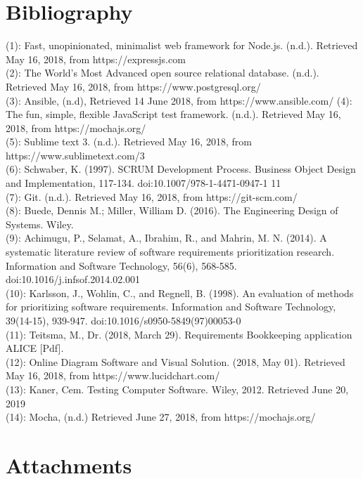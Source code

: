 \documentclass[paper=a4, fontsize=11pt,twoside]{scrartcl}	%
\begin{document}
\section{Bibliography}
(1): Fast, unopinionated, minimalist web framework for Node.js. (n.d.). Retrieved May 16, 2018, from https://expressjs.com \\ 
(2): The World's Most Advanced open source relational database. (n.d.). Retrieved May 16, 2018, from https://www.postgresql.org/ \\
(3): Ansible, (n.d), Retrieved 14 June 2018, from https://www.ansible.com/
(4): The fun, simple, flexible JavaScript test framework. (n.d.). Retrieved May 16, 2018, from https://mochajs.org/ \\
(5): Sublime text 3. (n.d.). Retrieved May 16, 2018, from https://www.sublimetext.com/3 \\
(6): Schwaber, K. (1997). SCRUM Development Process. Business Object Design and Implementation, 117-134. doi:10.1007/978-1-4471-0947-1 11\\ 
(7): Git. (n.d.). Retrieved May 16, 2018, from https://git-scm.com/ \\
(8): Buede, Dennis M.; Miller, William D. (2016). The Engineering Design of Systems. Wiley. \\
(9): Achimugu, P., Selamat, A., Ibrahim, R., and Mahrin, M. N. (2014). A systematic literature review of software requirements prioritization research. Information and Software Technology, 56(6), 568-585. doi:10.1016/j.infsof.2014.02.001 \\
(10): Karlsson, J., Wohlin, C., and Regnell, B. (1998). An evaluation of methods for prioritizing software requirements. Information and Software Technology, 39(14-15), 939-947. doi:10.1016/s0950-5849(97)00053-0 \\
(11): Teitsma, M., Dr. (2018, March 29). Requirements Bookkeeping application ALICE [Pdf]. \\
(12): Online Diagram Software and Visual Solution. (2018, May 01). Retrieved May 16, 2018, from https://www.lucidchart.com/ \\
(13): Kaner, Cem. Testing Computer Software. Wiley, 2012.
 Retrieved June 20, 2019 \\
(14): Mocha, (n.d.) Retrieved June 27, 2018, from https://mochajs.org/ 







 
\newpage

\section{Attachments}
\renewcommand\thesubsection{\thesection.\arabic{subsection}}
\end{document}
